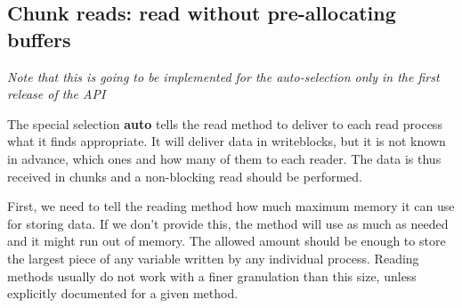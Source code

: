 \subsection{Chunk reads: read without pre-allocating buffers}
\emph{Note that this is going to be implemented for the auto-selection only in the first release of the API}

%

The special selection {\bf auto} tells the read method to deliver to each read process what it finds appropriate. It will deliver data in writeblocks, but it is not known in advance, which ones and how many of them to each reader. The data is thus received in chunks and a non-blocking read should be performed. 

First, we need to tell the reading method how much maximum memory it can use for storing data. If we don't provide this, the method will use as much as needed and it might run out of memory. The allowed amount should be enough to store the largest piece of any variable written by any individual process. Reading methods usually do not work with a finer granulation than this size, unless explicitly documented for a given method. 

